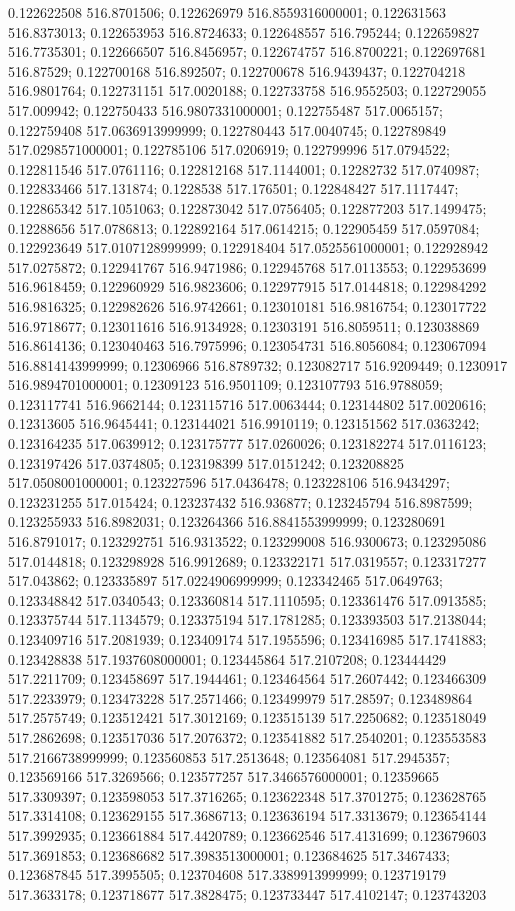 0.122622508 516.8701506; 0.122626979 516.8559316000001; 0.122631563 516.8373013; 0.122653953 516.8724633; 0.122648557 516.795244; 0.122659827 516.7735301; 0.122666507 516.8456957; 0.122674757 516.8700221; 0.122697681 516.87529; 0.122700168 516.892507; 0.122700678 516.9439437; 0.122704218 516.9801764; 0.122731151 517.0020188; 0.122733758 516.9552503; 0.122729055 517.009942; 0.122750433 516.9807331000001; 0.122755487 517.0065157; 0.122759408 517.0636913999999; 0.122780443 517.0040745; 0.122789849 517.0298571000001; 0.122785106 517.0206919; 0.122799996 517.0794522; 0.122811546 517.0761116; 0.122812168 517.1144001; 0.12282732 517.0740987; 0.122833466 517.131874; 0.1228538 517.176501; 0.122848427 517.1117447; 0.122865342 517.1051063; 0.122873042 517.0756405; 0.122877203 517.1499475; 0.12288656 517.0786813; 0.122892164 517.0614215; 0.122905459 517.0597084; 0.122923649 517.0107128999999; 0.122918404 517.0525561000001; 0.122928942 517.0275872; 0.122941767 516.9471986; 0.122945768 517.0113553; 0.122953699 516.9618459; 0.122960929 516.9823606; 0.122977915 517.0144818; 0.122984292 516.9816325; 0.122982626 516.9742661; 0.123010181 516.9816754; 0.123017722 516.9718677; 0.123011616 516.9134928; 0.12303191 516.8059511; 0.123038869 516.8614136; 0.123040463 516.7975996; 0.123054731 516.8056084; 0.123067094 516.8814143999999; 0.12306966 516.8789732; 0.123082717 516.9209449; 0.1230917 516.9894701000001; 0.12309123 516.9501109; 0.123107793 516.9788059; 0.123117741 516.9662144; 0.123115716 517.0063444; 0.123144802 517.0020616; 0.12313605 516.9645441; 0.123144021 516.9910119; 0.123151562 517.0363242; 0.123164235 517.0639912; 0.123175777 517.0260026; 0.123182274 517.0116123; 0.123197426 517.0374805; 0.123198399 517.0151242; 0.123208825 517.0508001000001; 0.123227596 517.0436478; 0.123228106 516.9434297; 0.123231255 517.015424; 0.123237432 516.936877; 0.123245794 516.8987599; 0.123255933 516.8982031; 0.123264366 516.8841553999999; 0.123280691 516.8791017; 0.123292751 516.9313522; 0.123299008 516.9300673; 0.123295086 517.0144818; 0.123298928 516.9912689; 0.123322171 517.0319557; 0.123317277 517.043862; 0.123335897 517.0224906999999; 0.123342465 517.0649763; 0.123348842 517.0340543; 0.123360814 517.1110595; 0.123361476 517.0913585; 0.123375744 517.1134579; 0.123375194 517.1781285; 0.123393503 517.2138044; 0.123409716 517.2081939; 0.123409174 517.1955596; 0.123416985 517.1741883; 0.123428838 517.1937608000001; 0.123445864 517.2107208; 0.123444429 517.2211709; 0.123458697 517.1944461; 0.123464564 517.2607442; 0.123466309 517.2233979; 0.123473228 517.2571466; 0.123499979 517.28597; 0.123489864 517.2575749; 0.123512421 517.3012169; 0.123515139 517.2250682; 0.123518049 517.2862698; 0.123517036 517.2076372; 0.123541882 517.2540201; 0.123553583 517.2166738999999; 0.123560853 517.2513648; 0.123564081 517.2945357; 0.123569166 517.3269566; 0.123577257 517.3466576000001; 0.12359665 517.3309397; 0.123598053 517.3716265; 0.123622348 517.3701275; 0.123628765 517.3314108; 0.123629155 517.3686713; 0.123636194 517.3313679; 0.123654144 517.3992935; 0.123661884 517.4420789; 0.123662546 517.4131699; 0.123679603 517.3691853; 0.123686682 517.3983513000001; 0.123684625 517.3467433; 0.123687845 517.3995505; 0.123704608 517.3389913999999; 0.123719179 517.3633178; 0.123718677 517.3828475; 0.123733447 517.4102147; 0.123743203 